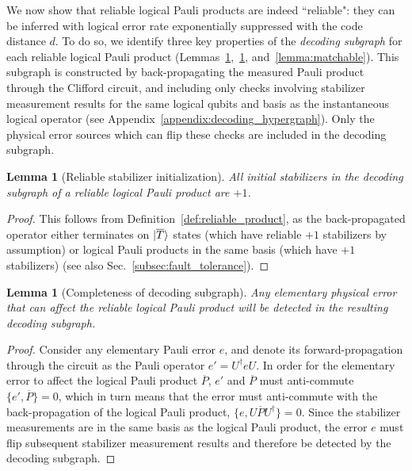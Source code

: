 \documentclass[prx,twocolumn,secnumarabic,balancelastpage,amsmath,amssymb,longbibliography]{revtex4-2}
\newtheorem{lemma}[thm]{Lemma}
\newcommand{\lop}[1]{\overline{#1}}
\newcommand{\lket}[1]{\ket{\overline{#1}}}
\begin{document}
We now show that reliable logical Pauli products are indeed ``reliable": they can be inferred with logical error rate exponentially suppressed with the code distance $d$.
%
To do so, we identify three key properties of the \textit{decoding subgraph} for each reliable logical Pauli product (Lemmas~\ref{lemma:reliable_init},~\ref{lemma:complete_subgraph}, and~\ref{lemma:matchable}).
%
This subgraph is constructed by back-propagating the measured Pauli product through the Clifford circuit, and including only checks involving stabilizer measurement results for the same logical qubits and basis as the instantaneous logical operator (see Appendix~\ref{appendix:decoding_hypergraph}).
%
Only the physical error sources which can flip these checks are included in the decoding subgraph.

\begin{lemma}[Reliable stabilizer initialization]
\label{lemma:reliable_init}
All initial stabilizers in the decoding subgraph of a reliable logical Pauli product are $+1$.
\end{lemma}
\begin{proof}
This follows from Definition~\ref{def:reliable_product}, as the back-propagated operator either terminates on $\lket{T}$ states (which have reliable $+1$ stabilizers by assumption) or logical Pauli products in the same basis (which have $+1$ stabilizers) (see also Sec.~\ref{subsec:fault_tolerance}).
\end{proof}

\begin{lemma}[Completeness of decoding subgraph]
\label{lemma:complete_subgraph}
Any elementary physical error that can affect the reliable logical Pauli product will be detected in the resulting decoding subgraph.
\end{lemma}
\begin{proof}
Consider any elementary Pauli error $e$, and denote its forward-propagation through the circuit as the Pauli operator $e'=U^\dagger eU$.
%
In order for the elementary error to affect the logical Pauli product $\lop{P}$, $e'$ and $\lop{P}$ must anti-commute $\{e',\lop{P}\}=0$, which in turn means that the error must anti-commute with the back-propagation of the logical Pauli product, $\{e,U\lop{P}U^\dagger\}=0$.
%
Since the stabilizer measurements are in the same basis as the logical Pauli product, the error $e$ must flip subsequent stabilizer measurement results and therefore be detected by the decoding subgraph.
\end{proof}
\end{document}
